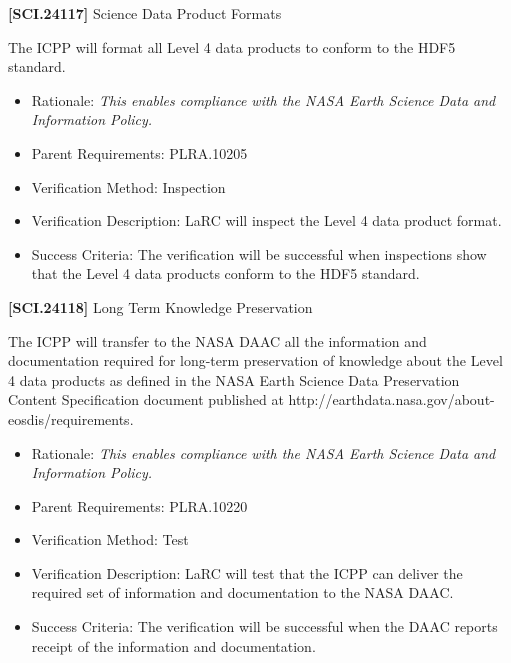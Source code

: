 \documentclass[12pt,oneside,oldfontcommands]{memoir}
\begin{document}
\textbf{[SCI.24117]} Science Data Product Formats

The \gls{ICPP} will format all Level 4 data products to conform to the HDF5 standard.

\begin{itemize}
\item{} Rationale: \emph{This enables compliance with the NASA Earth Science Data and Information Policy.}

\item{} Parent Requirements: PLRA.10205

\item{} Verification Method: Inspection

\item{} Verification Description: \gls{LaRC} will inspect the Level 4 data product format.

\item{} Success Criteria: The verification will be successful when \gls{inspection}s show that the Level 4 data products conform to the HDF5 standard.

\end{itemize}

\textbf{[SCI.24118]} Long Term Knowledge Preservation

The \gls{ICPP} will transfer to the NASA \gls{DAAC} all the information and documentation required for long-term preservation of knowledge about the Level 4 data products as defined in the NASA Earth Science Data Preservation Content Specification document published at http:\slash \slash earthdata.nasa.gov\slash about-eosdis\slash requirements.

\begin{itemize}
\item{} Rationale: \emph{This enables compliance with the NASA Earth Science Data and Information Policy.}

\item{} Parent Requirements: PLRA.10220

\item{} Verification Method: Test

\item{} Verification Description: \gls{LaRC} will \gls{test} that the \gls{ICPP} can deliver the required set of information and documentation to the NASA \gls{DAAC}.

\item{} Success Criteria: The verification will be successful when the \gls{DAAC} reports receipt of the information and documentation.

\end{itemize}
\end{document}
